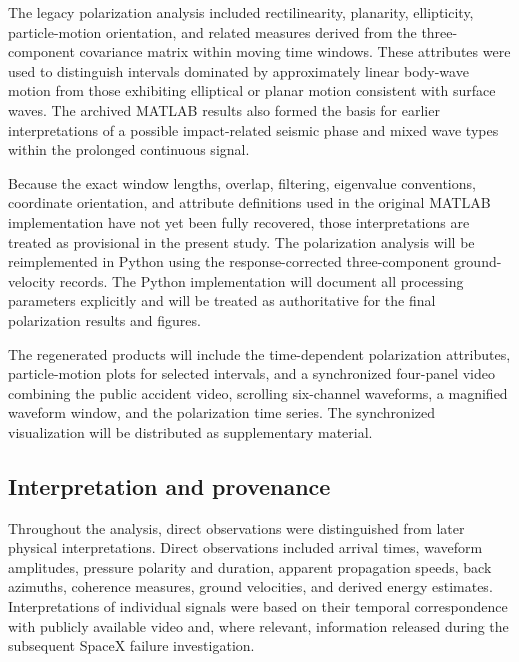 \documentclass[]{seismica}
\begin{document}
The legacy polarization analysis included rectilinearity, planarity,
ellipticity, particle-motion orientation, and related measures derived from
the three-component covariance matrix within moving time windows. These
attributes were used to distinguish intervals dominated by approximately
linear body-wave motion from those exhibiting elliptical or planar motion
consistent with surface waves. The archived MATLAB results also formed the
basis for earlier interpretations of a possible impact-related seismic phase
and mixed wave types within the prolonged continuous signal.

Because the exact window lengths, overlap, filtering, eigenvalue conventions,
coordinate orientation, and attribute definitions used in the original
MATLAB implementation have not yet been fully recovered, those interpretations
are treated as provisional in the present study. The polarization analysis
will be reimplemented in Python using the response-corrected three-component
ground-velocity records. The Python implementation will document all processing
parameters explicitly and will be treated as authoritative for the final
polarization results and figures.

The regenerated products will include the time-dependent polarization
attributes, particle-motion plots for selected intervals, and a synchronized
four-panel video combining the public accident video, scrolling six-channel
waveforms, a magnified waveform window, and the polarization time series.
The synchronized visualization will be distributed as supplementary material.

\subsection{Interpretation and provenance}

Throughout the analysis, direct observations were distinguished from later physical interpretations. Direct observations included arrival times, waveform amplitudes, pressure polarity and duration, apparent propagation speeds, back azimuths, coherence measures, ground velocities, and derived energy estimates. Interpretations of individual signals were based on their temporal correspondence with publicly available video and, where relevant, information released during the subsequent SpaceX failure investigation.
\end{document}
